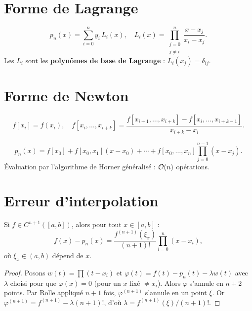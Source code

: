 \section{Forme de Lagrange}

\begin{definition}
\[
p_n(x) = \sum_{i=0}^n y_i\,L_i(x), \quad L_i(x)=\prod_{\substack{j=0\\j\neq i}}^n\frac{x-x_j}{x_i-x_j}.
\]
Les $L_i$ sont les \textbf{polyn\^omes de base de Lagrange} : $L_i(x_j)=\delta_{ij}$.
\end{definition}

\section{Forme de Newton}

\begin{definition}
\[
f[x_i]=f(x_i), \quad f[x_i,\ldots,x_{i+k}]=\frac{f[x_{i+1},\ldots,x_{i+k}]-f[x_i,\ldots,x_{i+k-1}]}{x_{i+k}-x_i}.
\]
\end{definition}

\begin{definition}
\[
p_n(x) = f[x_0]+f[x_0,x_1](x-x_0)+\cdots+f[x_0,\ldots,x_n]\prod_{j=0}^{n-1}(x-x_j).
\]
\'Evaluation par l'algorithme de Horner g\'en\'eralis\'e : $\mathcal{O}(n)$ op\'erations.
\end{definition}

\section{Erreur d'interpolation}

\begin{theoreme}\label{thm:erreur-interp}
Si $f\in C^{n+1}([a,b])$, alors pour tout $x\in[a,b]$ :
\[
f(x)-p_n(x) = \frac{f^{(n+1)}(\xi_x)}{(n+1)!}\prod_{i=0}^n(x-x_i),
\]
o\`u $\xi_x\in(a,b)$ d\'epend de $x$.
\end{theoreme}

\begin{proof}
Posons $w(t)=\prod(t-x_i)$ et $\varphi(t)=f(t)-p_n(t)-\lambda w(t)$ avec $\lambda$ choisi pour que $\varphi(x)=0$ (pour un $x$ fix\'e $\neq x_i$). Alors $\varphi$ s'annule en $n+2$ points. Par Rolle appliqu\'e $n+1$ fois, $\varphi^{(n+1)}$ s'annule en un point $\xi$. Or $\varphi^{(n+1)}=f^{(n+1)}-\lambda(n+1)!$, d'o\`u $\lambda=f^{(n+1)}(\xi)/(n+1)!$.
\end{proof}

